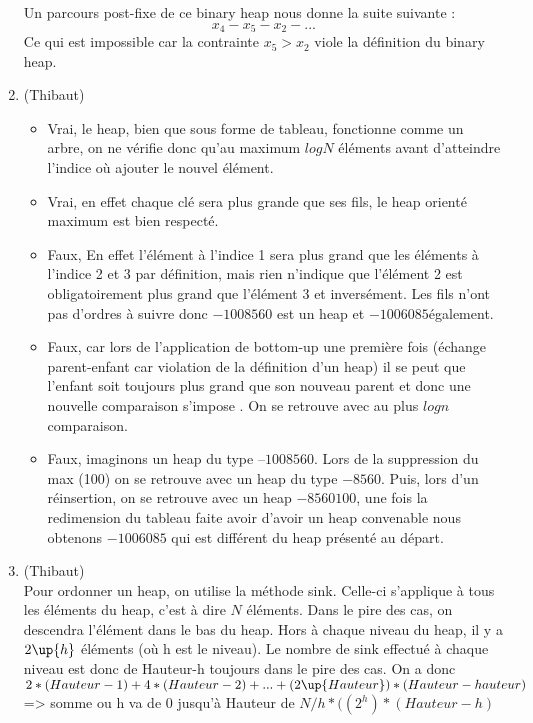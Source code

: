 \documentclass[11pt]{article}
\begin{document}
\begin{enumerate}
Un parcours post-fixe de ce binary heap nous donne la suite suivante :
$$ x_4 - x_5 - x_2 - ... $$
Ce qui est impossible car la contrainte $ x_5 > x_2 $ viole la définition du binary heap.

\item (Thibaut) \begin{itemize}
\item Vrai, le heap, bien que sous forme de tableau, fonctionne comme un arbre, on ne vérifie donc qu'au maximum $log N$ éléments avant d'atteindre l'indice où ajouter le nouvel élément.
\item Vrai, en effet chaque clé sera plus grande que ses fils, le heap orienté maximum est bien respecté.
\item Faux, En effet l'élément à l'indice 1 sera plus grand que les éléments à l'indice 2 et 3 par définition, mais rien n'indique que l'élément 2 est obligatoirement plus grand que l'élément 3 et inversément. Les fils n'ont pas d'ordres à suivre donc  $- 100 85 60$ est un heap et  $- 100 60 85 $également.
\item Faux, car lors de l'application de bottom-up une première fois (échange parent-enfant car violation de la définition d'un heap) il se peut que l'enfant soit toujours plus grand que son nouveau parent et donc une nouvelle comparaison s'impose . On se retrouve avec au plus $log n$ comparaison.
\item Faux, imaginons un heap du type $– 100 85 60$. Lors de la suppression du max (100) on se retrouve avec  un heap du type $- 85 60$. Puis, lors d'un réinsertion, on se retrouve avec un heap $-85 60 100$, une fois la redimension du tableau faite avoir d'avoir un heap convenable nous obtenons $- 100 60 85$ qui est différent du heap présenté au départ.
\end{itemize}
\bigskip




\item (Thibaut)\\Pour ordonner un heap, on utilise la méthode sink. Celle-ci s'applique à tous les éléments du heap, c'est à dire $N$ éléments. Dans le pire des cas, on descendra l'élément dans le bas du heap. Hors à chaque niveau du heap, il y a $2\up{h}$ éléments (où h est le niveau). Le nombre de sink effectué à chaque niveau est donc de Hauteur-h toujours dans le pire des cas. On a donc $2*(Hauteur-1)+4*(Hauteur-2)+...+(2\up{Hauteur})*(Hauteur-hauteur)$ =>  somme ou h va de 0 jusqu'à Hauteur de $N/h*((2^h)*(Hauteur-h)$
\bigskip



\end{enumerate}
\end{document}
